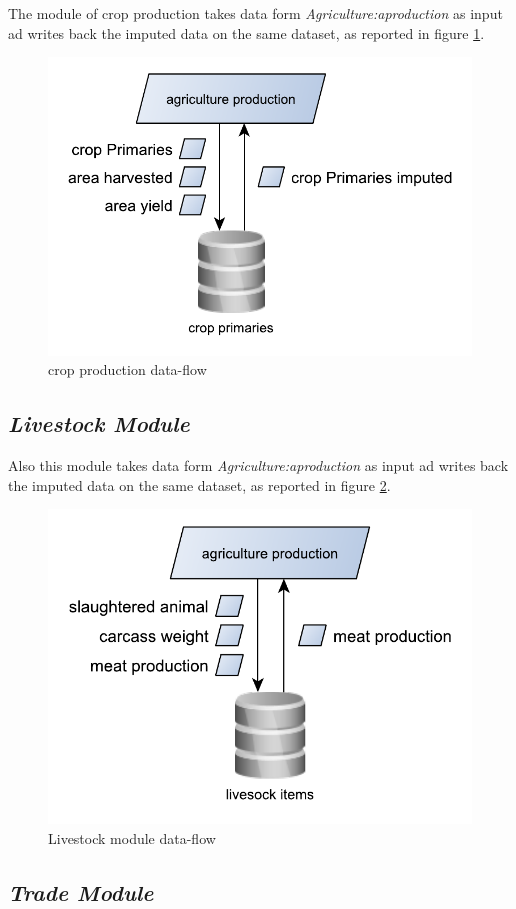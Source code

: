 \documentclass[]{article}
\begin{document}
The module of crop production takes data form
\emph{Agriculture:aproduction} as input ad writes back the imputed data
on the same dataset, as reported in figure \ref{fig:f6}.

\begin{figure}[H]

{\centering \includegraphics[width=0.5\linewidth]{images/SwsFbs/06_cropProduction} 

}

\caption{\label{fig:f6}crop production data-flow}\label{fig:f6}
\end{figure}

\subsection{\texorpdfstring{\emph{Livestock
Module}}{Livestock Module}}\label{livestock-module}

Also this module takes data form \emph{Agriculture:aproduction} as input
ad writes back the imputed data on the same dataset, as reported in
figure \ref{fig:f7}.

\begin{figure}[H]

{\centering \includegraphics[width=0.5\linewidth]{images/SwsFbs/07_Livestock} 

}

\caption{\label{fig:f7}Livestock module data-flow}\label{fig:f7}
\end{figure}

\subsection{\texorpdfstring{\emph{Trade
Module}}{Trade Module}}\label{trade-module}
\end{document}
